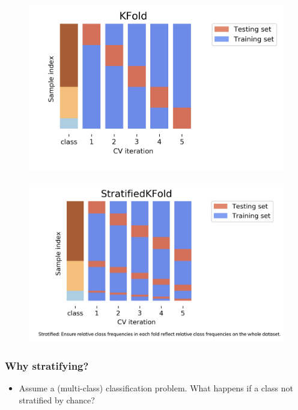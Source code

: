 \documentclass[compress, aspectratio=54]{beamer}
\begin{document}
\begin{frame}
\begin{figure}
\includegraphics[width=\linewidth ]{Figures/k-fold.png}
\end{figure}
\end{frame}

\begin{frame}
\begin{figure}
\includegraphics[width=\linewidth ]{Figures/stratified-k-fold.png}
\end{figure}
\end{frame}



\begin{frame}
\frametitle{Why stratifying?}
\begin{itemize}
\item Assume a (multi-class) classification problem. What happens if a class not stratified by chance?
\end{itemize}
\end{frame}
\end{document}
